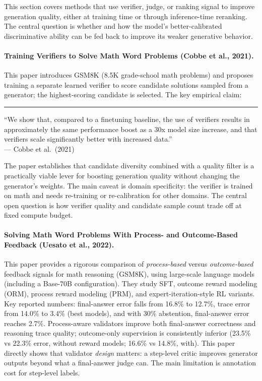 \documentclass[11pt]{article}
\newenvironment{paperquote}{%
  \vspace{0.5em}%
  \begin{list}{}{%
    \setlength{\leftmargin}{1.5em}%
    \setlength{\rightmargin}{0em}%
    \setlength{\topsep}{0.2em}%
    \setlength{\parsep}{0pt}%
  }%
  \item\relax\small\itshape\leavevmode%
  \hspace{-1.3em}\textcolor{gray!80}{\rule{2pt}{1em}}\hspace{0.5em}%
}{%
  \end{list}%
  \vspace{0.3em}%
}
\begin{document}
This section covers methods that use verifier, judge, or ranking signal to improve generation quality, either at training time or through inference-time reranking. The central question is whether and how the model's better-calibrated discriminative ability can be fed back to improve its weaker generative behavior.

\paragraph{Training Verifiers to Solve Math Word Problems (Cobbe et al., 2021).}
This paper introduces GSM8K (8.5K grade-school math problems) and proposes training a separate learned verifier to score candidate solutions sampled from a generator; the highest-scoring candidate is selected. The key empirical claim:

\begin{paperquote}
\small ``We show that, compared to a finetuning baseline, the use of verifiers results in approximately the same performance boost as a 30x model size increase, and that verifiers scale significantly better with increased data.''\\
\hfill --- Cobbe et al.\ (2021)
\end{paperquote} The paper establishes that candidate diversity combined with a quality filter is a practically viable lever for boosting generation quality without changing the generator's weights. The main caveat is domain specificity: the verifier is trained on math and needs re-training or re-calibration for other domains. The central open question is how verifier quality and candidate sample count trade off at fixed compute budget.

\paragraph{Solving Math Word Problems With Process- and Outcome-Based Feedback (Uesato et al., 2022).}
This paper provides a rigorous comparison of \emph{process-based} versus \emph{outcome-based} feedback signals for math reasoning (GSM8K), using large-scale language models (including a Base-70B configuration). They study SFT, outcome reward modeling (ORM), process reward modeling (PRM), and expert-iteration-style RL variants. Key reported numbers: final-answer error falls from 16.8\% to 12.7\%, trace error from 14.0\% to 3.4\% (best models), and with 30\% abstention, final-answer error reaches 2.7\%. Process-aware validators improve both final-answer correctness and reasoning trace quality; outcome-only supervision is consistently inferior (23.5\% vs 22.3\% error, without reward models; 16.6\% vs 14.8\%, with). This paper directly shows that validator \emph{design} matters: a step-level critic improves generator outputs beyond what a final-answer judge can. The main limitation is annotation cost for step-level labels.
\end{document}
